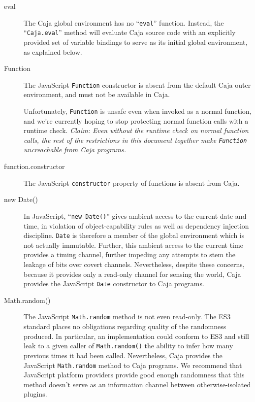 \documentclass[letterpaper,twocolumn,10pt]{article}
\newcommand{\code}[1]{{\tt {#1}}}              %
\begin{document}
\begin{description}

    \item[eval] The Caja global environment has no ``\code{eval}'' function. 
    Instead, the ``\code{Caja.eval}'' method will evaluate Caja source code 
    with an explicitly provided set of variable bindings to serve as its 
    initial global environment, as explained below.
    
    \item[Function] The JavaScript \code{Function} constructor is absent from 
    the default Caja outer environment, and must not be available in Caja.

    Unfortunately, \code{Function} is unsafe even when invoked as a normal 
    function, and we're currently hoping to stop protecting normal function 
    calls with a runtime check. \emph{Claim: Even without the runtime check 
    on normal function calls, the rest of the restrictions in this document 
    together make \code{Function} uncreachable from Caja programs.}
    
    \item[function.constructor] The JavaScript \code{constructor} property of 
    functions is absent from Caja.

    \item[new Date()] In JavaScript, ``\code{new Date()}''  gives ambient 
    access to the current date and time, in violation of object-capability 
    rules as well as dependency injection discipline. \code{Date} is 
    therefore a member of the global environment which is not actually 
    immutable. Further, this ambient access to the current time provides a 
    timing channel, further impeding any attempts to stem the leakage of bits 
    over covert channels. Nevertheless, despite these concerns, because it 
    provides only a read-only channel for sensing the world, Caja provides 
    the JavaScript \code{Date} constructor to Caja programs.

    \item[Math.random()] The JavaScript \code{Math.random} method is not even 
    read-only. The ES3 standard places no obligations regarding quality of the
    randomness produced. In particular, an implementation could conform to ES3
    and still leak to a given caller of \code{Math.random()} the ability to
    infer how many previous times it had been called. Nevertheless, Caja
    provides the JavaScript \code{Math.random} method to Caja programs. We
    recommend that JavaScript platform providers provide good enough
    randomness that this method doesn't serve as an information channel
    between otherwise-isolated plugins.
    
\end{description}
\end{document}
